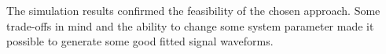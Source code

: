 







The simulation results confirmed the feasibility of the chosen approach.
Some trade-offs in mind and the ability to change some system parameter made it possible to generate some good fitted signal waveforms.

